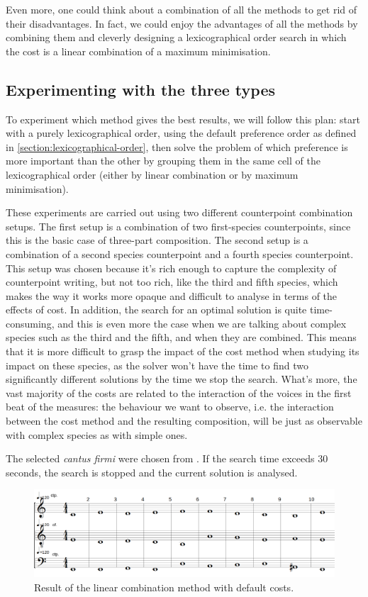 Even more, one could think about a combination of all the methods to get rid of their disadvantages. In fact, we could enjoy the advantages of all the methods by combining them and cleverly designing a lexicographical order search in which the cost is a linear combination of a maximum minimisation.

\subsection{Experimenting with the three types}
To experiment which method gives the best results, we will follow this plan: start with a purely lexicographical order, using the default preference order as defined in \ref{section:lexicographical-order}, then solve the problem of which preference is more important than the other by grouping them in the same cell of the lexicographical order (either by linear combination or by maximum minimisation).


These experiments are carried out using two different counterpoint combination setups. The first setup is a combination of two first-species counterpoints, since this is the basic case of three-part composition. The second setup is a combination of a second species counterpoint and a fourth species counterpoint. This setup was chosen because it's rich enough to capture the complexity of counterpoint writing, but not too rich, like the third and fifth species, which makes the way it works more opaque and difficult to analyse in terms of the effects of cost. In addition, the search for an optimal solution is quite time-consuming, and this is even more the case when we are talking about complex species such as the third and the fifth, and when they are combined. This means that it is more difficult to grasp the impact of the cost method when studying its impact on these species, as the solver won't have the time to find two significantly different solutions by the time we stop the search. What's more, the vast majority of the costs are related to the interaction of the voices in the first beat of the measures: the behaviour we want to observe, i.e. the interaction between the cost method and the resulting composition, will be just as observable with complex species as with simple ones.

The selected \textit{cantus firmi} were chosen from \gap. If the search time exceeds 30 seconds, the search is stopped and the current solution is analysed.

\begin{figure}[h]
    \centering
    \includegraphics[width=1\textwidth]{Images/Experiments/linear-combination-1sp0.png}
    \caption{Result of the linear combination method with default costs.}
    \label{fig:combili-1sp0}
\end{figure}

